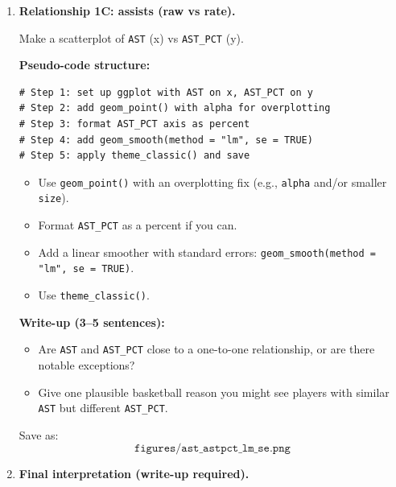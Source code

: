 \documentclass[11pt]{article}
\begin{document}
\begin{enumerate}
  \noindent \textbf{Write-up (3--5 sentences):}
  \begin{itemize}
    \item Does the trend look linear, or do you suspect curvature?
    \item What does the SE ribbon suggest about uncertainty across usage levels?
  \end{itemize}

  \noindent Save as:
  \[
    \texttt{figures/usg\_ts\_eff\_lm\_se.png}
  \]

  \item \textbf{Relationship 1C: assists (raw vs rate).}

  Make a scatterplot of \texttt{AST} (x) vs \texttt{AST\_PCT} (y).

  \textbf{Pseudo-code structure:}
\begin{verbatim}
# Step 1: set up ggplot with AST on x, AST_PCT on y
# Step 2: add geom_point() with alpha for overplotting
# Step 3: format AST_PCT axis as percent
# Step 4: add geom_smooth(method = "lm", se = TRUE)
# Step 5: apply theme_classic() and save
\end{verbatim}

  \begin{itemize}
    \item Use \texttt{geom\_point()} with an overplotting fix (e.g., \texttt{alpha} and/or smaller \texttt{size}).
    \item Format \texttt{AST\_PCT} as a percent if you can.
    \item Add a linear smoother with standard errors: \texttt{geom\_smooth(method = "lm", se = TRUE)}.
    \item Use \texttt{theme\_classic()}.
  \end{itemize}

  \noindent \textbf{Write-up (3--5 sentences):}
  \begin{itemize}
    \item Are \texttt{AST} and \texttt{AST\_PCT} close to a one-to-one relationship, or are there notable exceptions?
    \item Give one plausible basketball reason you might see players with similar \texttt{AST} but different \texttt{AST\_PCT}.
  \end{itemize}

  \noindent Save as:
  \[
    \texttt{figures/ast\_astpct\_lm\_se.png}
  \]

  \item \textbf{Final interpretation (write-up required).}


\end{enumerate}
\end{document}
